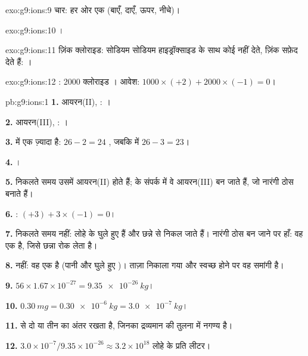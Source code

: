 \begin{solution}{exo:g9:ions:9}
चार: हर ओर एक (बाएँ, दाएँ, ऊपर, नीचे)।
\end{solution}

\begin{solution}{exo:g9:ions:10}
।
\end{solution}

\begin{solution}{exo:g9:ions:11}
ज़िंक क्लोराइड: सोडियम  सोडियम हाइड्रॉक्साइड के साथ कोई  नहीं देते,
ज़िंक  सफ़ेद  देते हैं:
।
\end{solution}

\begin{solution}{exo:g9:ions:12}
: 2000 क्लोराइड । आवेश: $1000 \times (+2) + 2000 \times
(-1) = 0$।
\end{solution}

\begin{solution}{pb:g9:ions:1}
\textbf{1.} आयरन(II), : ।

\textbf{2.} आयरन(III), : ।

\textbf{3.}  में एक ज़्यादा है: $26 - 2 = 24$ , जबकि
 में $26 - 3 = 23$।

\textbf{4.} ।

\textbf{5.} निकलते समय उसमें आयरन(II)  होते हैं;  के संपर्क में वे
आयरन(III)  बन जाते हैं, जो नारंगी ठोस बनाते हैं।

\textbf{6.} : $(+3) + 3 \times (-1) = 0$।

\textbf{7.} निकलते समय नहीं: लोहे के  घुले हुए हैं और छन्ने से निकल जाते
हैं। नारंगी ठोस बन जाने पर हाँ: वह एक  है, जिसे छन्ना
रोक लेता है।

\textbf{8.} नहीं: वह एक  है (पानी और घुले हुए )। ताज़ा निकाला गया
और स्वच्छ होने पर वह समांगी है।

\textbf{9.} $56 \times 1.67 \times 10^{-27} = \qty{9.35e-26}{kg}$।

\textbf{10.} $\qty{0.30}{mg} = \qty{0.30e-6}{kg} = \qty{3.0e-7}{kg}$।

\textbf{11.}   से दो या तीन  का अंतर रखता है, जिनका
द्रव्यमान  की तुलना में नगण्य है।

\textbf{12.} $3.0 \times 10^{-7} / 9.35 \times 10^{-26} \approx 3.2
\times 10^{18}$ लोहे के  प्रति लीटर।
\end{solution}
